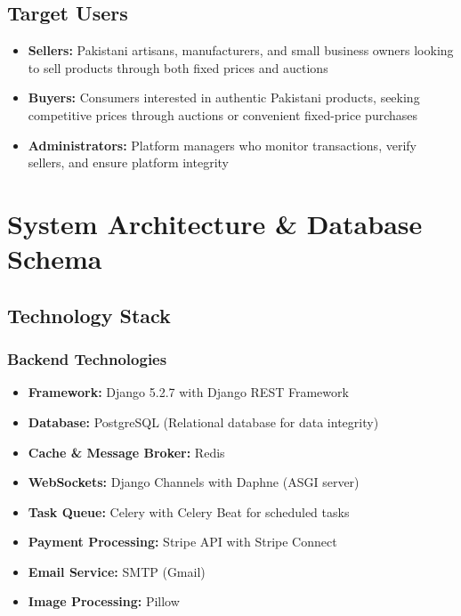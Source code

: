 \documentclass[12pt,a4paper]{article}
\begin{document}
\subsection{Target Users}
\begin{itemize}
    \item \textbf{Sellers:} Pakistani artisans, manufacturers, and small business owners looking to sell products through both fixed prices and auctions
    \item \textbf{Buyers:} Consumers interested in authentic Pakistani products, seeking competitive prices through auctions or convenient fixed-price purchases
    \item \textbf{Administrators:} Platform managers who monitor transactions, verify sellers, and ensure platform integrity
\end{itemize}

\newpage

\section{System Architecture \& Database Schema}

\subsection{Technology Stack}

\subsubsection{Backend Technologies}
\begin{itemize}[leftmargin=*]
    \item \textbf{Framework:} Django 5.2.7 with Django REST Framework
    \item \textbf{Database:} PostgreSQL (Relational database for data integrity)
    \item \textbf{Cache \& Message Broker:} Redis
    \item \textbf{WebSockets:} Django Channels with Daphne (ASGI server)
    \item \textbf{Task Queue:} Celery with Celery Beat for scheduled tasks
    \item \textbf{Payment Processing:} Stripe API with Stripe Connect
    \item \textbf{Email Service:} SMTP (Gmail)
    \item \textbf{Image Processing:} Pillow
\end{itemize}
\end{document}
